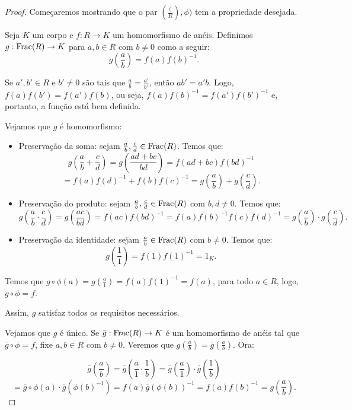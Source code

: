 \begin{proof}
    Começaremos mostrando que o par $(\frac(R), \phi)$ tem a propriedade desejada.

    Seja $K$ um corpo e $f:R\rightarrow K$ um homomorfismo de anéis.
    Definimos $g:\operatorname{Frac}(R)\rightarrow K$ para $a, b \in R$ com $b\neq 0$ como a seguir:
    \[g\left(\frac{a}{b}\right)=f(a)f(b)^{-1}.\]

    Se $a', b' \in R$ e $b'\neq 0$ são tais que $\frac{a}{b}=\frac{a'}{b'}$, então $ab'=a'b$.
    Logo, $f(a)f(b')=f(a')f(b)$, ou seja, $f(a)f(b)^{-1}=f(a')f(b')^{-1}$ e, portanto, a função está bem definida.

    Vejamos que $g$ é homomorfismo:

    \begin{itemize}
        \item Preservação da soma: sejam $\frac{a}{b}, \frac{c}{d} \in \operatorname{Frac}(R)$. Temos que:
        \[g\left(\frac{a}{b}+\frac{c}{d}\right)=g\left(\frac{ad+bc}{bd}\right)=f(ad+bc)f(bd)^{-1}\]
        \[=f(a)f(d)^{-1}+f(b)f(c)^{-1}=g\left(\frac{a}{b}\right)+g\left(\frac{c}{d}\right).\]
        \item Preservação do produto: sejam $\frac{a}{b}, \frac{c}{d} \in \operatorname{Frac}(R)$ com $b, d\neq 0$. Temos que:
        \[g\left(\frac{a}{b}\cdot\frac{c}{d}\right)=g\left(\frac{ac}{bd}\right)=f(ac)f(bd)^{-1}=f(a)f(b)^{-1}f(c)f(d)^{-1}=g\left(\frac{a}{b}\right)\cdot g\left(\frac{c}{d}\right).\]
        \item Preservação da identidade: sejam $\frac{a}{b} \in \operatorname{Frac}(R)$ com $b\neq 0$. Temos que:
        \[g\left(\frac{1}{1}\right)=f(1)f(1)^{-1}=1_K.\]
    \end{itemize}

    Temos que $g\circ \phi(a)=g(\frac{a}{1})=f(a)f(1)^{-1}=f(a)$, para todo $a \in R$, logo, $g\circ \phi=f$.

    Assim, $g$ satisfaz todos os requisitos necessários.

    Vejamos que $g$ é único.
    Se $\bar g:\operatorname{Frac}(R)\rightarrow K$ é um homomorfismo de anéis tal que $\bar g\circ \phi=f$, fixe $a, b \in R$ com $b\neq 0$. Veremos que $g\left(\frac{a}{b}\right)=\bar g\left(\frac{a}{b}\right)$.
    Ora:

    \[\bar g\left(\frac{a}{b}\right)=\bar g\left(\frac{a}{1}\cdot\frac{1}{b}\right)=\bar g\left(\frac{a}{1}\right)\cdot \bar g\left(\frac{1}{b}\right)\]
    \[=\bar g\circ \phi(a)\cdot \bar g(\phi(b)^{-1})=f(a)\bar g(\phi(b))^{-1}=f(a)f(b)^{-1}=g\left(\frac{a}{b}\right).\]


\end{proof}
